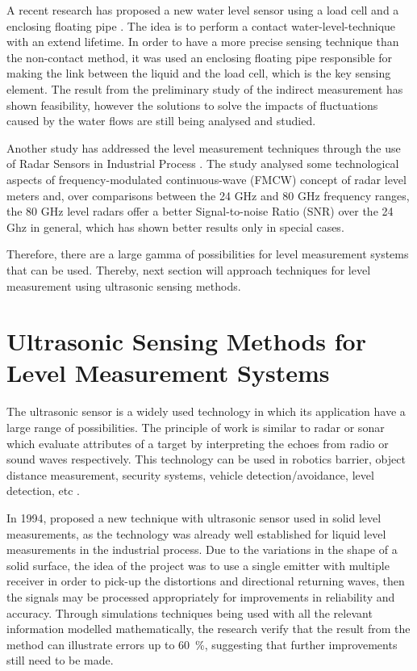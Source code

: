 A recent research has proposed a new water level sensor using a load cell and a enclosing floating pipe \cite{WANG:2018}. 
The idea is to perform a contact water-level-technique with an extend lifetime. In order to have a more precise sensing technique than the non-contact method, it was used an enclosing floating pipe responsible for making the link between the liquid and the load cell, which is the key sensing element. The result from the preliminary study of the indirect measurement has shown feasibility, however the solutions to solve the impacts of fluctuations caused by the water flows are still being analysed and studied.

Another study has addressed the level measurement techniques through the use of Radar Sensors in Industrial Process \cite{VOGT:2018}. The study analysed some technological aspects of frequency-modulated continuous-wave (FMCW) concept of radar level meters and, over comparisons between the 24 GHz and 80 GHz frequency ranges, the 80 GHz level radars offer a better Signal-to-noise Ratio (SNR) over the 24 Ghz in general, which has shown better results only in special cases. 

Therefore, there are a large gamma of possibilities for level measurement systems that can be used. Thereby, next section will approach techniques for level measurement using ultrasonic sensing methods.


\section{Ultrasonic Sensing Methods for Level Measurement Systems}\label{ultrasonic sensing methods}

The ultrasonic sensor is a widely used technology in which its application have a large range of possibilities. The principle of work is similar to radar or sonar which evaluate attributes of a target by interpreting the echoes from radio or sound waves respectively. This technology can be used in robotics barrier, object distance measurement, security systems, vehicle detection/avoidance, level detection, etc \cite{datasheet:US015}. 

In 1994, \cite{LONGBOTTOM:1994} proposed a new technique with ultrasonic sensor used in solid level measurements, as the technology was already well established for liquid level measurements in the industrial process. Due to the variations in the shape of a solid surface, the idea of the project was to use a single emitter with multiple receiver in order to pick-up the distortions and directional returning waves, then the signals may be processed appropriately for improvements in reliability and accuracy. Through simulations techniques being used with all the relevant information modelled mathematically, the research verify that the result from the method can illustrate errors up to 60~\%, suggesting that further improvements still need to be made.

